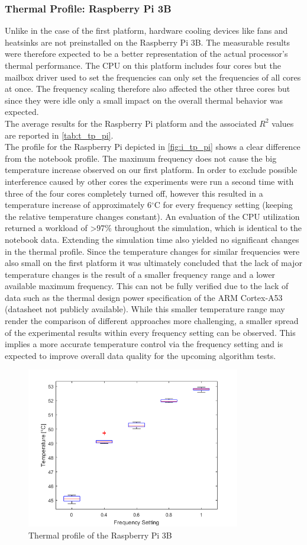 \subsubsection{Thermal Profile: Raspberry Pi 3B}
Unlike in the case of the first platform, hardware cooling devices like fans and heatsinks are not preinstalled on the Raspberry Pi 3B. The measurable results were therefore expected to be a better representation of the actual processor's thermal performance. The CPU on this platform includes four cores but the mailbox driver used to set the frequencies can only set the frequencies of all cores at once. The frequency scaling therefore also affected the other three cores but since they were idle only a small impact on the overall thermal behavior was expected.\\ \hspace*{0.5ex}\hspace{0.5ex} The average results for the Raspberry Pi platform and the associated $R^2$ values are reported in \autoref{tab:t_tp_pi}.\\

The profile for the Raspberry Pi depicted in \autoref{fig:i_tp_pi} shows a clear difference from the notebook profile. The maximum frequency does not cause the big temperature increase observed on our first platform. In order to exclude possible interference caused by other cores the experiments were run a second time with three of the four cores completely turned off, however this resulted in a temperature increase of approximately 6$^{\circ}$C for every frequency setting (keeping the relative temperature changes constant). An evaluation of the CPU utilization returned a workload of >97\% throughout the simulation, which is identical to the notebook data. Extending the simulation time also yielded no significant changes in the thermal profile. Since the temperature changes for similar frequencies were also small on the first platform it was ultimately concluded that the lack of major temperature changes is the result of a smaller frequency range and a lower available maximum frequency. This can not be fully verified due to the lack of data such as the thermal design power specification of the ARM Cortex-A53 (datasheet not publicly available). While this smaller temperature range may render the comparison of different approaches more challenging, a smaller spread of the experimental results within every frequency setting can be observed. This implies a more accurate temperature control via the frequency setting and is expected to improve overall data quality for the upcoming algorithm tests.\\
\begin{figure}[htpb]
  \centering
  \includegraphics[height=7cm]{figures/profile_pi}
  \caption[Thermal Profile Raspberry Pi 3B]{Thermal profile of the Raspberry Pi 3B}\label{fig:i_tp_pi}
\end{figure}